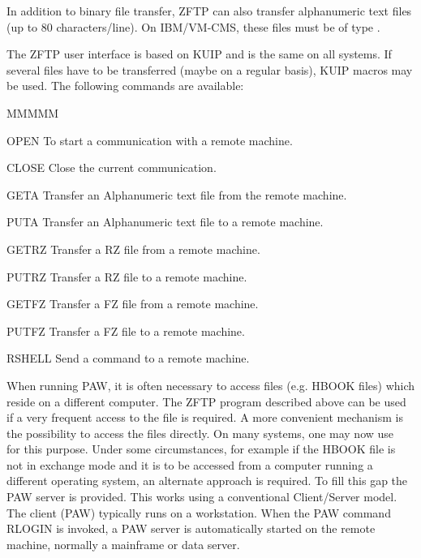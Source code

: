In addition to binary file transfer, ZFTP can also transfer alphanumeric
text files (up to 80 characters/line). On IBM/VM-CMS, these files must be
of type .
 
The ZFTP user interface is based on KUIP and is the same on all systems.
If several files have to be transferred (maybe on a regular basis),
KUIP macros may be used. The following commands are available:
\begin{DL}{MMMMM}
\item[OPEN
]To start a communication with a remote machine.
\item[CLOSE
]Close the current communication.
\item[GETA
]Transfer an Alphanumeric text file from the remote machine.
\item[PUTA
]Transfer an Alphanumeric text file to a remote machine.
\item[GETRZ
]Transfer a RZ file from a remote machine.
\item[PUTRZ
]Transfer a RZ file to a remote machine.
\item[GETFZ
]Transfer a FZ file from a remote machine.
\item[PUTFZ
]Transfer a FZ file to a remote machine.
\item[RSHELL
]Send a command to a remote machine.
\end{DL}
 
 
When running PAW, it is often necessary to access files
(e.g. HBOOK files) which reside on a different computer. 
The ZFTP program described
above can be used if a very frequent access to the file is required. A
more convenient mechanism is the possibility to access the 
files directly. On many systems, one may now use ~\cite{bib-NFS}
for this purpose. Under some circumstances, for example if the HBOOK
file is not in exchange mode and it is to be accessed from a computer
running a different operating system, an alternate approach is required.
To fill this gap the PAW server is provided. This works using
a conventional Client/Server model. The client
(PAW) typically runs on a workstation. When the PAW command RLOGIN is invoked,
a PAW server is automatically started on the remote machine, normally
a mainframe or data server. 
 
